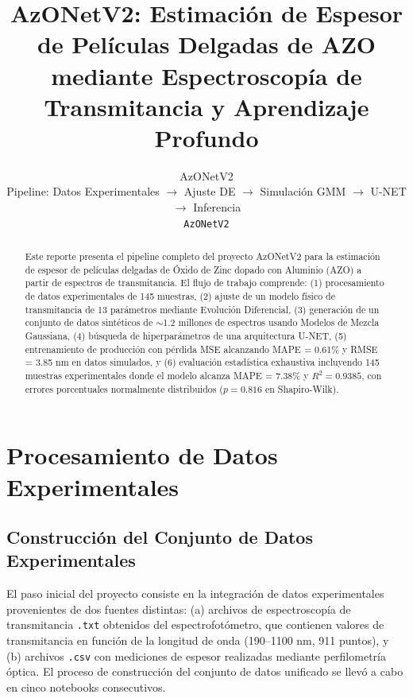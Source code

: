 \documentclass{article}
\title{AzONetV2: Estimaci\'on de Espesor de Pel\'iculas Delgadas de AZO \\ mediante Espectroscop\'ia de Transmitancia y Aprendizaje Profundo}
\author{
  AzONetV2 \\
  Pipeline: Datos Experimentales $\rightarrow$ Ajuste DE $\rightarrow$ Simulaci\'on GMM $\rightarrow$ U-NET $\rightarrow$ Inferencia \\
  \texttt{AzONetV2}
}
\begin{document}
\maketitle

\begin{abstract}
Este reporte presenta el pipeline completo del proyecto AzONetV2 para la estimaci\'on de espesor de pel\'iculas delgadas de \'Oxido de Zinc dopado con Aluminio (AZO) a partir de espectros de transmitancia. El flujo de trabajo comprende: (1) procesamiento de datos experimentales de 145 muestras, (2) ajuste de un modelo f\'isico de transmitancia de 13 par\'ametros mediante Evoluci\'on Diferencial, (3) generaci\'on de un conjunto de datos sint\'eticos de $\sim$1.2 millones de espectros usando Modelos de Mezcla Gaussiana, (4) b\'usqueda de hiperpar\'ametros de una arquitectura U-NET, (5) entrenamiento de producci\'on con p\'erdida MSE alcanzando MAPE = 0.61\% y RMSE = 3.85 nm en datos simulados, y (6) evaluaci\'on estad\'istica exhaustiva incluyendo 145 muestras experimentales donde el modelo alcanza MAPE = 7.38\% y $R^2 = 0.9385$, con errores porcentuales normalmente distribuidos ($p = 0.816$ en Shapiro-Wilk).
\end{abstract}


\section{Procesamiento de Datos Experimentales}
\label{sec:data-processing}

\subsection{Construcci\'on del Conjunto de Datos Experimentales}

El paso inicial del proyecto consiste en la integraci\'on de datos experimentales provenientes de dos fuentes distintas: (a) archivos de espectroscop\'ia de transmitancia \texttt{.txt} obtenidos del espectrofot\'ometro, que contienen valores de transmitancia en funci\'on de la longitud de onda (190--1100 nm, 911 puntos), y (b) archivos \texttt{.csv} con mediciones de espesor realizadas mediante perfilometr\'ia \'optica. El proceso de construcci\'on del conjunto de datos unificado se llev\'o a cabo en cinco notebooks consecutivos.
\end{document}
